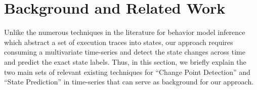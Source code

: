 \chapter{Background and Related Work} \label{sec:background}
Unlike the numerous techniques in the literature for behavior model inference \cite{lang1998results, walkinshaw2016inferring, Lo2007Mining, dallmeier2006mining} which abstract a set of execution traces into states, our approach requires consuming a multivariate time-series and detect the state changes across time and predict the exact state labels. Thus, in this section, we briefly explain the two main sets of relevant existing techniques for ``Change Point Detection'' and ``State Prediction'' in time-series that can serve as background for our approach.  

